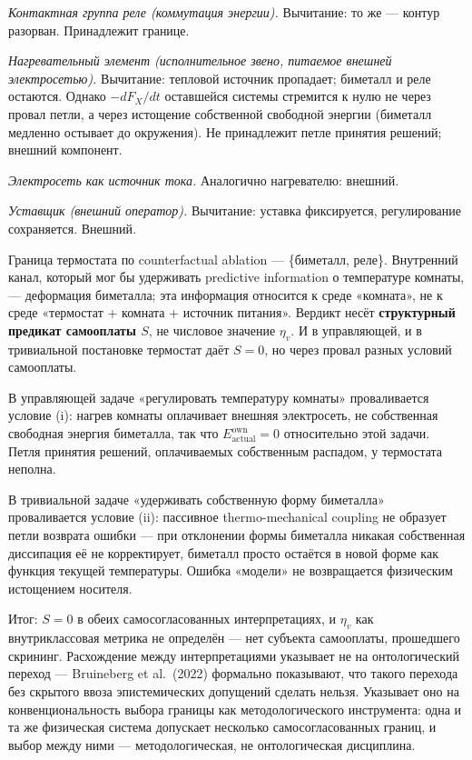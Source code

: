 \documentclass[pdflatex,sn-mathphys-ay]{sn-jnl}
\begin{document}
\emph{Контактная группа реле (коммутация энергии).} Вычитание: то же --- контур разорван. Принадлежит границе.

\emph{Нагревательный элемент (исполнительное звено, питаемое внешней электросетью).} Вычитание: тепловой источник пропадает; биметалл и реле остаются. Однако \(-dF_X/dt\) оставшейся системы стремится к нулю не через провал петли, а через истощение собственной свободной энергии (биметалл медленно остывает до окружения). Не принадлежит петле принятия решений; внешний компонент.

\emph{Электросеть как источник тока.} Аналогично нагревателю: внешний.

\emph{Уставщик (внешний оператор).} Вычитание: уставка фиксируется, регулирование сохраняется. Внешний.

Граница термостата по counterfactual ablation --- \{биметалл, реле\}. Внутренний канал, который мог бы удерживать predictive information о температуре комнаты, --- деформация биметалла; эта информация относится к среде «комната», не к среде «термостат + комната + источник питания». Вердикт несёт \textbf{структурный предикат самооплаты \(S\)}, не числовое значение \(\eta_v\). И в управляющей, и в тривиальной постановке термостат даёт \(S = 0\), но через провал разных условий самооплаты.

В управляющей задаче «регулировать температуру комнаты» проваливается условие (i): нагрев комнаты оплачивает внешняя электросеть, не собственная свободная энергия биметалла, так что \(E_{\text{actual}}^{\text{own}} = 0\) относительно этой задачи. Петля принятия решений, оплачиваемых собственным распадом, у термостата неполна.

В тривиальной задаче «удерживать собственную форму биметалла» проваливается условие (ii): пассивное thermo-mechanical coupling не образует петли возврата ошибки --- при отклонении формы биметалла никакая собственная диссипация её не корректирует, биметалл просто остаётся в новой форме как функция текущей температуры. Ошибка «модели» не возвращается физическим истощением носителя.

Итог: \(S = 0\) в обеих самосогласованных интерпретациях, и \(\eta_v\) как внутриклассовая метрика не определён --- нет субъекта самооплаты, прошедшего скрининг. Расхождение между интерпретациями указывает не на онтологический переход --- Bruineberg et al.~(2022) формально показывают, что такого перехода без скрытого ввоза эпистемических допущений сделать нельзя. Указывает оно на конвенциональность выбора границы как методологического инструмента: одна и та же физическая система допускает несколько самосогласованных границ, и выбор между ними --- методологическая, не онтологическая дисциплина.
\end{document}
